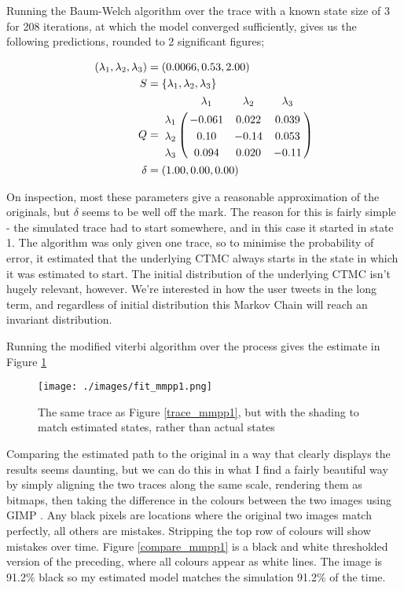 Running the Baum-Welch algorithm over the trace with a known state size of 3 for 208 iterations, at which the model converged sufficiently, gives us the following predictions, rounded to 2 significant figures;

\begin{align*}
(\lambda_1,\lambda_2,\lambda_3) &= (0.0066,0.53,2.00)\\
S &= \{\lambda_1,\lambda_2,\lambda_3\}\\
Q &= \bordermatrix{      & \lambda_1 & \lambda_2 & \lambda_3\cr
                \lambda_1 & -0.061 & 0.022 & 0.039 \cr
                \lambda_2 & 0.10 & -0.14 & 0.053 \cr
                \lambda_3 & 0.094 & 0.020 & -0.11 \cr
			}\\
\delta &= (1.00,0.00,0.00)
\end{align*}

On inspection, most these parameters give a reasonable approximation of the originals, but $\delta$ seems to be well off the mark. The reason for this is fairly simple - the simulated trace had to start somewhere, and in this case it started in state 1. The algorithm was only given one trace, so to minimise the probability of error, it estimated that the underlying CTMC always starts in the state in which it was estimated to start. The initial distribution of the underlying CTMC isn't hugely relevant, however. We're interested in how the user tweets in the long term, and regardless of initial distribution this Markov Chain will reach an invariant distribution.

Running the modified viterbi algorithm over the process gives the estimate in Figure \ref{fit_mmpp1}

\begin{figure}[h!]
\texttt{[image: ./images/fit\_mmpp1.png]}
\caption{The same trace as Figure \ref{trace_mmpp1}, but with the shading to match estimated states, rather than actual states}
\label{fit_mmpp1}
\end{figure}

Comparing the estimated path to the original in a way that clearly displays the results seems daunting, but we can do this in what I find a fairly beautiful way by simply aligning the two traces along the same scale, rendering them as bitmaps, then taking the difference in the colours between the two images using GIMP \cite[eqn 8.15]{gimpdocs}. Any black pixels are locations where the original two images match perfectly, all others are mistakes. Stripping the top row of colours will show mistakes over time. Figure \ref{compare_mmpp1} is a black and white thresholded version of the preceding, where all colours appear as white lines. The image is 91.2\% black so my estimated model matches the simulation 91.2\% of the time.

